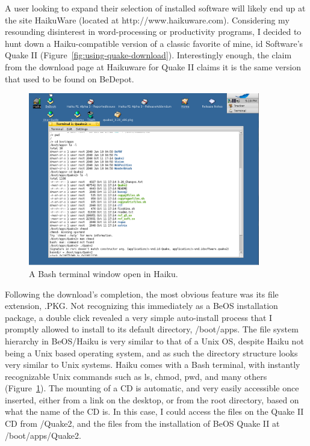 \documentclass{article}
\newcommand{\figref}[1]{Figure~\ref{fig:#1}}
\begin{document}
A user looking to expand their selection of installed software will
likely end up at the site HaikuWare (located at
http://www.haikuware.com).  Considering my resounding disinterest in
word-processing or productivity programs, I decided to hunt down a
Haiku-compatible version of a classic favorite of mine, id Software's
Quake II (\figref{using-quake-download}).  Interestingly enough, the
claim from the download page at Haikuware for Quake II claims it is
the same version that used to be found on BeDepot.
	
\begin{figure}[h]
\centering
\includegraphics[width=0.9\textwidth]{figs/using-terminal.png}
\caption{A Bash terminal window open in Haiku.}
\label{fig:using-terminal}
\end{figure}

Following the download's completion, the most obvious feature was its
file extension, .PKG. Not recognizing this immediately as a BeOS
installation package, a double click revealed a very simple
auto-install process that I promptly allowed to install to its default
directory, /boot/apps.  The file system hierarchy in BeOS/Haiku is
very similar to that of a Unix OS, despite Haiku not being a Unix
based operating system, and as such the directory structure looks very
similar to Unix systems.  Haiku comes with a Bash terminal, with
instantly recognizable Unix commands such as ls, chmod, pwd, and many
others (\figref{using-terminal}).  The mounting of a CD is automatic,
and very easily accessible once inserted, either from a link on the
desktop, or from the root directory, based on what the name of the CD
is.  In this case, I could access the files on the Quake II CD from
/Quake2, and the files from the installation of BeOS Quake II at
/boot/apps/Quake2.
\end{document}
